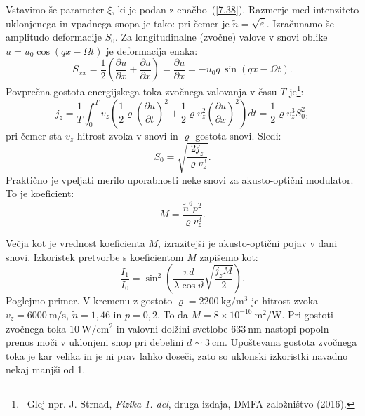 Vstavimo še parameter $\xi$, ki je podan z enačbo~(\ref{7.38}).
Razmerje med intenziteto uklonjenega in vpadnega snopa je tako:
pri čemer je $\tilde{n}=\sqrt{\tilde{\varepsilon}}$.
Izračunamo še amplitudo deformacije $S_0$. Za longitudinalne (zvočne) valove v snovi oblike 
$u = u_0 \cos(qx - \Omega t)$ je deformacija enaka:
\begin{equation}
S_{xx} = \frac{1}{2}\left(\frac{\partial u}{\partial x}+ 
\frac{\partial u}{\partial x}\right) = \frac{\partial u}{\partial x} = - u_0 q\, \sin(qx - \Omega t).
\end{equation}
Povprečna gostota energijskega toka zvočnega valovanja v času $T$ je\footnote{~Glej 
npr. J. Strnad, {\it Fizika 1. del}, druga izdaja, DMFA-založništvo 
(2016).}:
\begin{equation}
j_{z}= \frac{1}{T}\int_0^T 
v_z \left(\frac{1}{2} \varrho \left(\frac{\partial u}{\partial t}\right)^2
+ \frac{1}{2} \varrho v_z^2\left(\frac{\partial u}{\partial x}\right)^2
\right) dt = \frac{1}{2} \varrho v_z^3 S_0^2,
\label{7.49}
\end{equation}
pri čemer sta $v_z$ hitrost zvoka v snovi in $\varrho$ gostota snovi. 
Sledi: 
\begin{equation}
S_{0}=\sqrt{\frac{2j_{z}}{\varrho v_{z}^{3}}}.
\label{7.50}
\end{equation}
Praktično je vpeljati merilo uporabnosti neke snovi za akusto-optični modulator. To je 
koeficient: 
\begin{equation}
M=\frac{\tilde{n}^{6}p^{2}}{\varrho v_{z}^{3}}.
\label{7.51}
\end{equation}

Večja kot je vrednost koeficienta $M$, izrazitejši je akusto-optični pojav v dani snovi. 
Izkoristek pretvorbe s koeficientom $M$ zapišemo kot:
\begin{equation}
 \frac{I_{1}}{I_{0}}=\sin^{2}\left(\frac{\pi d}{\lambda\cos\vartheta}\sqrt{\frac{j_z M}{2}}\right)\!\!.
\end{equation}
Poglejmo primer. V kremenu z gostoto $\varrho=2200~\si{\kilo\gram/\metre^3}$ 
je hitrost zvoka $v_{z}=6000~\si{\metre/\second}$,
$\tilde{n}=1,46$ in $p=0,2$. To da $M=8\times 10^{-16}~\si{\metre^2/\watt}$.
Pri gostoti zvočnega toka $10~\si{\watt/\centi\metre^2}$ in valovni dolžini svetlobe 
$633~\si{\nano\metre}$ nastopi popoln prenos moči v uklonjeni snop pri 
debelini $d \sim 3~\si{\centi\metre}$. Upoštevana gostota zvočnega toka je kar velika
in je ni prav lahko doseči, zato so uklonski izkoristki navadno nekaj manjši od 1.

